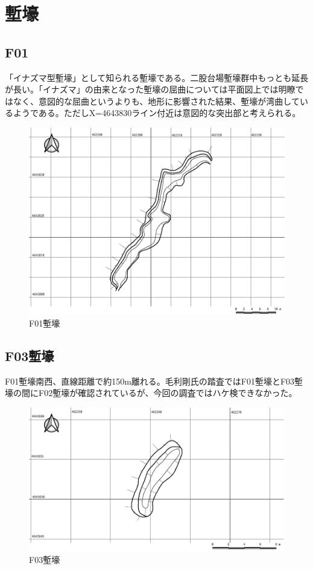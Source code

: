 \documentclass[14Q]{jsarticle}
\begin{document}
\section{塹壕}
\subsection{F01}
「イナズマ型塹壕」として知られる塹壕である。二股台場塹壕群中もっとも延長が長い。「イナズマ」の由来となった塹壕の屈曲については平面図上では明瞭ではなく、意図的な屈曲というよりも、地形に影響された結果、塹壕が湾曲しているようである。ただしX=4643830ライン付近は意図的な突出部と考えられる。

\begin{figure}[h]
\centering
\includegraphics[width=160truemm]{fig/F01.pdf}
\caption{F01塹壕}
\label{f01}
\end{figure}

\subsection{F03塹壕}
F01塹壕南西、直線距離で約150m離れる。毛利剛氏の踏査ではF01塹壕とF03塹壕の間にF02塹壕が確認されているが、今回の調査ではハケ検できなかった。

\begin{figure}[h]
\centering
\includegraphics[width=160truemm]{fig/F03.pdf}
\caption{F03塹壕}
\label{f01}
\end{figure}
\end{document}
